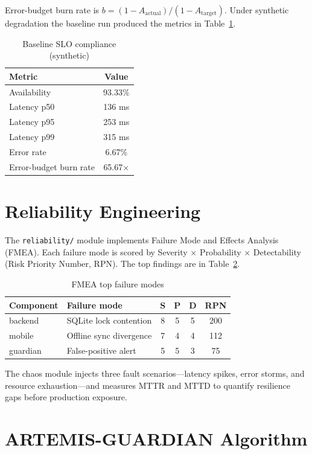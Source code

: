 \documentclass[10pt,journal]{IEEEtran}
\begin{document}
Error-budget burn rate is $b = (1-A_\text{actual})/(1-A_\text{target})$.
Under synthetic degradation the baseline run produced the metrics in
Table~\ref{tab:slo}.

\begin{table}[h]
\centering
\caption{Baseline SLO compliance (synthetic)}
\label{tab:slo}
\begin{tabular}{lc}
\toprule
Metric & Value \\
\midrule
Availability & 93.33\% \\
Latency p50 & 136 ms \\
Latency p95 & 253 ms \\
Latency p99 & 315 ms \\
Error rate & 6.67\% \\
Error-budget burn rate & 65.67$\times$ \\
\bottomrule
\end{tabular}
\end{table}

\section{Reliability Engineering}
\label{sec:reliability}

The \texttt{reliability/} module implements Failure Mode and Effects Analysis
(FMEA). Each failure mode is scored by Severity $\times$ Probability $\times$
Detectability (Risk Priority Number, RPN). The top findings are in
Table~\ref{tab:fmea}.

\begin{table}[h]
\centering
\caption{FMEA top failure modes}
\label{tab:fmea}
\begin{tabular}{llccc c}
\toprule
Component & Failure mode & S & P & D & RPN \\
\midrule
backend  & SQLite lock contention    & 8 & 5 & 5 & 200 \\
mobile   & Offline sync divergence   & 7 & 4 & 4 & 112 \\
guardian & False-positive alert      & 5 & 5 & 3 &  75 \\
\bottomrule
\end{tabular}
\end{table}

The chaos module injects three fault scenarios---latency spikes, error storms,
and resource exhaustion---and measures MTTR and MTTD to quantify resilience gaps
before production exposure.

\section{ARTEMIS-GUARDIAN Algorithm}
\label{sec:guardian}
\end{document}
